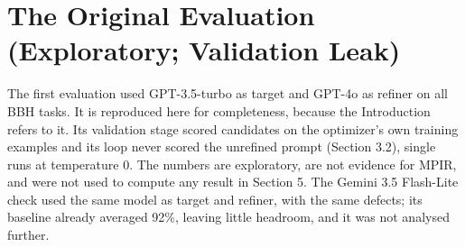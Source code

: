\documentclass{ieeeaccess}
\begin{document}
\section{The Original Evaluation (Exploratory; Validation Leak)}

The first evaluation used GPT-3.5-turbo as target and GPT-4o as refiner on all BBH tasks. It is reproduced here for completeness, because the Introduction refers to it. Its validation stage scored candidates on the optimizer's own training examples and its loop never scored the unrefined prompt (Section 3.2), single runs at temperature 0. The numbers are exploratory, are not evidence for MPIR, and were not used to compute any result in Section 5. The Gemini 3.5 Flash-Lite check used the same model as target and refiner, with the same defects; its baseline already averaged 92\%, leaving little headroom, and it was not analysed further.
\end{document}
